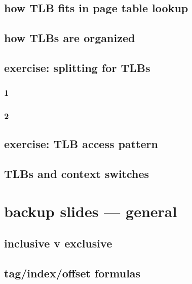 \subsection{how TLB fits in page table lookup}


\subsection{how TLBs are organized}

\subsection{exercise: splitting for TLBs}
\subsubsection{1}

\subsubsection{2}



\subsection{exercise: TLB access pattern}




\subsection{TLBs and context switches}


\section{backup slides --- general}

\subsection{inclusive v exclusive}


\subsection{tag/index/offset formulas}



